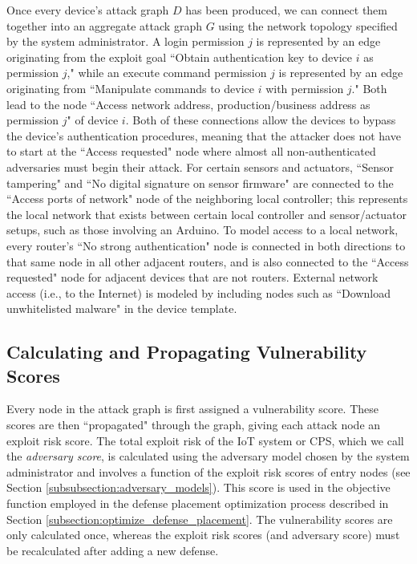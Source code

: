 \documentclass[10pt,journal,compsoc]{IEEEtran}
\begin{document}
Once every device's attack graph $D$ has been produced, we can connect them together into an
aggregate attack graph $G$ using the network topology specified by the system administrator.
A login permission 
$j$ is represented by an edge originating from the exploit goal ``Obtain authentication key to 
device $i$ as permission $j$," while an execute command permission $j$ is represented by an edge 
originating from ``Manipulate commands to device $i$ with permission $j$." Both lead to the 
node ``Access network address, production/business address as permission $j$" of device $i$. Both of 
these connections allow the devices to bypass the device's authentication procedures, meaning that 
the attacker does not have to start at the ``Access requested" node where almost all non-authenticated 
adversaries must begin their attack. For certain sensors and actuators, ``Sensor tampering" and 
``No digital signature on sensor firmware" are connected to the ``Access ports of network" node of the 
neighboring local controller; this represents the local network that exists between certain local 
controller and sensor/actuator setups, such as those involving an Arduino. To model access to a local 
network, every router's ``No strong authentication" node is connected in both directions to that same 
node in all other adjacent routers, and is also connected to the ``Access requested"  node for 
adjacent devices that are not routers. External network access (i.e., to the Internet) is modeled by 
including nodes such as ``Download unwhitelisted malware" in the device template.

\begin{comment}
\par If the system administrator does not know the permission connections for a certain part of the system, GRAVITAS can auto-generate a topology that specifies the distribution of connections in a certain system component. This process is similar to the one used to randomly generate IoT/CPS for testing purposes (see Section \ref{subsection:parameter_validation} for more detail).
\end{comment}

\subsection{Calculating and Propagating Vulnerability Scores}
\label{subsection:calculate_and_propagate_vulnerability_scores}

Every node in the attack graph is first assigned a vulnerability score. These scores are then ``propagated" through the graph, giving each attack node an exploit risk score. The total exploit risk of the IoT system or CPS, which we call the \textit{adversary score}, is calculated using the adversary model chosen by the system administrator and involves a function of the exploit risk scores of entry nodes (see Section \ref{subsubsection:adversary_models}). This score is used in the objective function employed in the defense placement optimization process described in Section \ref{subsection:optimize_defense_placement}. The vulnerability scores are only calculated once, whereas the exploit risk scores (and adversary score) must be recalculated after adding a new defense.
\end{document}
